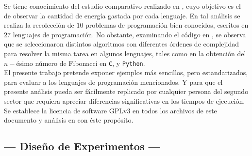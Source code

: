 \documentclass[11pt,a4paper]{article}
\begin{document}
Se tiene conocimiento del estudio comparativo realizado en , cuyo objetivo es el de observar la cantidad de energía gastada por cada lenguaje.
En tal análisis se realiza la recolección de \(10\) problemas de programación bien conocidos, escritos en \(27\) lenguajes de programación.
No obstante, examinando el código en , se observa que se seleccionaron distintos algoritmos con diferentes órdenes de complejidad para resolver la misma tarea en algunos lenguajes, tales como en la obtención del \(n-\)ésimo número de Fibonacci en \texttt{C}, y \texttt{Python}. \\[2mm]

El presente trabajo pretende exponer ejemplos más sencillos, pero estandarizados, para evaluar a los lenguajes de programación mencionados.
Y para que el presente análisis pueda ser fácilmente replicado por cualquier persona del segundo sector que requiera apreciar diferencias significativas en los tiempos de ejecución.
Se establece la licencia de software GPLv3 en todos los archivos de este documento y análisis en  con éste propósito.

\subsection{--- Diseño de Experimentos ---} %
\label{sub:diseño}
\end{document}
